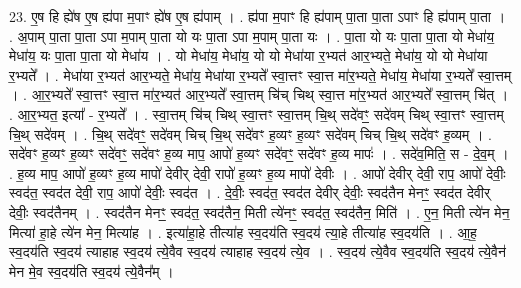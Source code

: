 \documentclass[17pt]{extarticle}
\begin{document}
23. ए॒ष हि ह्ये॑ष ए॒ष ह्य॑पा म॒पाꣳ ह्ये॑ष ए॒ष ह्य॑पाम् । . ह्य॑पा म॒पाꣳ हि ह्य॑पाम् पा॒ता पा॒ता ऽपाꣳ हि ह्य॑पाम् पा॒ता । . अ॒पाम् पा॒ता पा॒ता ऽपा म॒पाम् पा॒ता यो यः पा॒ता ऽपा म॒पाम् पा॒ता यः । . पा॒ता यो यः पा॒ता पा॒ता यो मेधा॑य॒ मेधा॑य॒ यः पा॒ता पा॒ता यो मेधा॑य । . यो मेधा॑य॒ मेधा॑य॒ यो यो मेधा॑या र॒भ्यत॑ आर॒भ्यते॒ मेधा॑य॒ यो यो मेधा॑या र॒भ्यते᳚ । . मेधा॑या र॒भ्यत॑ आर॒भ्यते॒ मेधा॑य॒ मेधा॑या र॒भ्यते᳚ स्वा॒त्तꣳ स्वा॒त्त मा॑र॒भ्यते॒ मेधा॑य॒ मेधा॑या र॒भ्यते᳚ स्वा॒त्तम् । . आ॒र॒भ्यते᳚ स्वा॒त्तꣳ स्वा॒त्त मा॑र॒भ्यत॑ आर॒भ्यते᳚ स्वा॒त्तम् चि॑च् चिथ् स्वा॒त्त मा॑र॒भ्यत॑ आर॒भ्यते᳚ स्वा॒त्तम् चि॑त् । . आ॒र॒भ्यत॒ इत्या᳚ - र॒भ्यते᳚ । . स्वा॒त्तम् चि॑च् चिथ् स्वा॒त्तꣳ स्वा॒त्तम् चि॒थ् सदे॑वꣳ॒॒ सदे॑वम् चिथ् स्वा॒त्तꣳ स्वा॒त्तम् चि॒थ् सदे॑वम् । . चि॒थ् सदे॑वꣳ॒॒ सदे॑वम् चिच् चि॒थ् सदे॑वꣳ ह॒व्यꣳ ह॒व्यꣳ सदे॑वम् चिच् चि॒थ् सदे॑वꣳ ह॒व्यम् । . सदे॑वꣳ ह॒व्यꣳ ह॒व्यꣳ सदे॑वꣳ॒॒ सदे॑वꣳ ह॒व्य माप॒ आपो॑ ह॒व्यꣳ सदे॑वꣳ॒॒ सदे॑वꣳ ह॒व्य मापः॑ । . सदे॑व॒मिति॒ स - दे॒व॒म् । . ह॒व्य माप॒ आपो॑ ह॒व्यꣳ ह॒व्य मापो॑ देवीर् देवी॒ रापो॑ ह॒व्यꣳ ह॒व्य मापो॑ देवीः । . आपो॑ देवीर् देवी॒ राप॒ आपो॑ देवीः॒ स्वद॑त॒ स्वद॑त देवी॒ राप॒ आपो॑ देवीः॒ स्वद॑त । . दे॒वीः॒ स्वद॑त॒ स्वद॑त देवीर् देवीः॒ स्वद॑तैन मेनꣳ॒॒ स्वद॑त देवीर् देवीः॒ स्वद॑तैनम् । . स्वद॑तैन मेनꣳ॒॒ स्वद॑त॒ स्वद॑तैन॒ मिती त्ये॑नꣳ॒॒ स्वद॑त॒ स्वद॑तैन॒ मिति॑ । . ए॒न॒ मिती त्ये॑न मेन॒ मित्या॑ हा॒हे त्ये॑न मेन॒ मित्या॑ह । . इत्या॑हा॒हे तीत्या॑ह स्व॒दय॑ति स्व॒दय॑ त्या॒हे तीत्या॑ह स्व॒दय॑ति । . आ॒ह॒ स्व॒दय॑ति स्व॒दय॑ त्याहाह स्व॒दय॑ त्ये॒वैव स्व॒दय॑ त्याहाह स्व॒दय॑ त्ये॒व । . स्व॒दय॑ त्ये॒वैव स्व॒दय॑ति स्व॒दय॑ त्ये॒वैन॑ मेन मे॒व स्व॒दय॑ति स्व॒दय॑ त्ये॒वैन᳚म् । \newline
\end{document}
